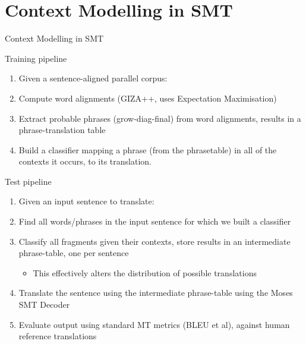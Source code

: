 \documentclass[compress]{beamer}
\begin{document}
\section{Context Modelling in SMT}
\begin{frame}{Context Modelling in SMT}

  \begin{block}{Training pipeline}
    \begin{enumerate}
      \item Given a sentence-aligned parallel corpus:
      \item Compute word alignments (GIZA++, uses Expectation Maximisation)
      \item Extract probable phrases (grow-diag-final) from word alignments,
        results in a phrase-translation table
      \item Build a classifier mapping a phrase (from the phrasetable) in all of
        the contexts it occurs, to its translation.
    \end{enumerate}
  \end{block}

\end{frame}
\begin{frame}
  
  \begin{block}{Test pipeline}
    \begin{enumerate}
      \item Given an input sentence to translate:
      \item Find all words/phrases in the input sentence for which we built a
        classifier
      \item Classify all fragments given their contexts,  store results in an
        intermediate phrase-table, one per sentence
      \begin{itemize}
        \item This effectively alters the distribution of possible translations
      \end{itemize}
      \item Translate the sentence using the intermediate phrase-table using the
      Moses SMT Decoder
      \item Evaluate output using standard MT metrics (BLEU et al), against
        human reference translations
    \end{enumerate}
  \end{block}

\end{frame}
\end{document}
